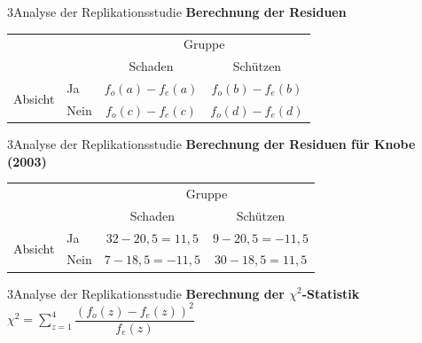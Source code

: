 \documentclass[xcolor=table,9pt,aspectratio=169]{beamer}
\begin{document}
\begin{frame}{\vspace*{10mm}3\hspace*{1em}Analyse der Replikationsstudie}
\textbf{Berechnung der Residuen}\\
\smallskip
\begin{tabular}{llcc}
   \arrayrulecolor{blue2}\hline
                              &        & \multicolumn{2}{c}{Gruppe}                    \\
                              &        & Schaden               & Schützen              \\
   \hline
   \multirow{2}{*}{Absicht}   & Ja     & $f_{o}(a)-f_{e}(a)$   & $f_{o}(b)-f_{e}(b)$   \\
                              & Nein   & $f_{o}(c)-f_{e}(c)$   & $f_{o}(d)-f_{e}(d)$   \\
   \hline
\end{tabular}
\end{frame}


\begin{frame}{\vspace*{10mm}3\hspace*{1em}Analyse der Replikationsstudie}
\textbf{Berechnung der Residuen für Knobe (2003)}\\
\smallskip
\begin{tabular}{llcc}
   \arrayrulecolor{blue2}\hline
                              &        & \multicolumn{2}{c}{Gruppe}          \\
                              &        & Schaden          & Schützen         \\
   \hline
   \multirow{2}{*}{Absicht}   & Ja     & $32-20,5=11,5$   & $9-20,5=-11,5$   \\
                              & Nein   & $7-18,5=-11,5$   & $30-18,5=11,5$   \\
   \hline
\end{tabular}
\end{frame}


\begin{frame}{\vspace*{10mm}3\hspace*{1em}Analyse der Replikationsstudie}
\textbf{Berechnung der $\chi^{2}$-Statistik}\\
\smallskip
$\chi^{2}=\sum_{z=1}^{4}\dfrac{(f_{o}(z)-f_{e}(z))^{2}}{f_{e}(z)}$
\end{frame}
\end{document}
